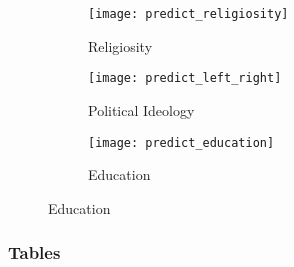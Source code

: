 \documentclass[12pt,letterpaper]{article}
\begin{document}
	
\begin{figure}[htbp]
	\begin{mdframed}[
		skipabove=0.5\baselineskip, %
		skipbelow=0.5\baselineskip, %
		linewidth=1pt, %
		innerleftmargin=10pt, %
		innerrightmargin=10pt, %
		innertopmargin=10pt, %
		innerbottommargin=10pt, %
		]
		\centering
		\caption{Religiosity, ideology, education, and social distance}
		\label{fig:Religiosity_ideology_education_social_distance}
		\begin{subfigure}[b]{0.3\textwidth} %
			\centering
			\texttt{[image: predict\_religiosity]} %
			\caption{Religiosity}
			\label{fig:predict_religiosity}
		\end{subfigure}\hfill
		\begin{subfigure}[b]{0.3\textwidth} %
			\centering
			\texttt{[image: predict\_left\_right]} %
			\caption{Political Ideology}
			\label{fig:predict_leftright}
		\end{subfigure}\hfill
		\begin{subfigure}[b]{0.3\textwidth} %
			\centering
			\texttt{[image: predict\_education]} %
			\caption{Education}
			\label{fig:predict_education}
		\end{subfigure}
	\end{mdframed}
\end{figure}
		
	\subsubsection{Tables}
	
\end{document}

